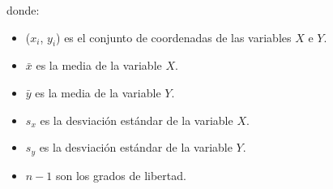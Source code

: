 donde:

\begin{itemize}
    \item ($x_i$, $y_i$) es el conjunto de coordenadas de las variables $X$ e $Y$.
    \item $\bar{x}$ es la media de la variable $X$.
    \item $\bar{y}$ es la media de la variable $Y$.
    \item $s_x$ es la desviación estándar de la variable $X$.
    \item $s_y$ es la desviación estándar de la variable $Y$.
    \item $n - 1$ son los grados de libertad.
\end{itemize}
